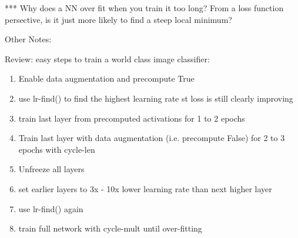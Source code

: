 \documentclass[12pt]{article}
\begin{document}
*** Why does a NN over fit when you train it too long? From a loss function persective, is it just more likely to find a steep local minimum?

Other Notes:

Review: easy steps to train a world class image classifier:

\begin{enumerate}
	\item Enable data augmentation and precompute \eql True
	\item use lr-find() to find the highest learning rate st loss is still clearly improving
	\item train last layer from precomputed activations for 1 to 2 epochs
	\item Train last layer with data augmentation (i.e. precompute \eql False) for 2 to 3 epochs with cycle-len 
	\item Unfreeze all layers
	\item set earlier layers to 3x - 10x lower learning rate than next higher layer
	\item use lr-find() again
	\item train full network with cycle-mult  until over-fitting
\end{enumerate}
\end{document}
